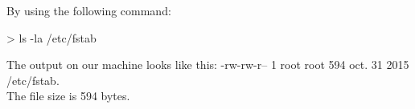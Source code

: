 By using the following command:
\hspace*{1cm} \begin{cmdblock}
> ls -la /etc/fstab 
\end{cmdblock}
The output on our machine looks like this: -rw-rw-r-- 1 root root 594 oct.  31  2015 /etc/fstab. \\
The file size is 594 bytes.